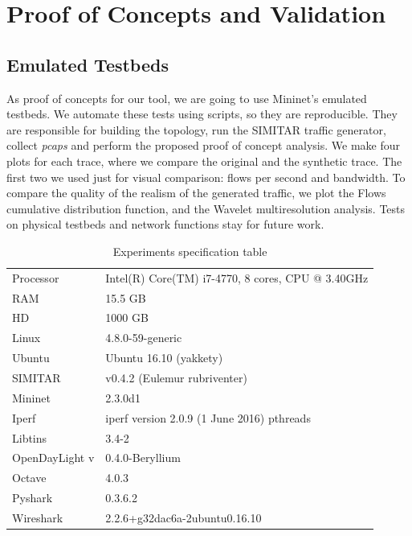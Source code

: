\chapter{Proof of Concepts and Validation}\label{ch:validation}

\section{Emulated Testbeds}



As proof of concepts for our tool, we are going to use Mininet's emulated testbeds. We automate these tests using scripts, so they are reproducible.  They are responsible for building the topology, run the SIMITAR traffic generator, collect \textit{pcaps} and perform the proposed proof of concept analysis.  We make four plots for each trace, where we compare the original and the synthetic trace. The first two we used just for visual comparison:  flows per second and bandwidth. To compare the quality of the realism of the generated traffic, we plot the Flows cumulative distribution function\cite{harpoon-paper}, and the Wavelet multiresolution analysis\cite{swing-paper}.  Tests on physical testbeds and network functions stay for future work.

\begin{table}[ht!]
	\centering
	\caption{Experiments specification table}
	\label{tab:specifications}
	\begin{tabular}{ll}
		\hline
		Processor            & Intel(R) Core(TM) i7-4770, 8 cores, CPU @ 3.40GHz \\
		RAM                  & 15.5 GB                                           \\
		HD                   & 1000 GB                                            \\
		Linux         & 4.8.0-59-generic                                  \\
		Ubuntu        & Ubuntu 16.10 (yakkety)                            \\
		SIMITAR       & v0.4.2 (Eulemur rubriventer)                      \\
		Mininet       & 2.3.0d1                                           \\
		Iperf         & iperf version 2.0.9 (1 June 2016) pthreads        \\
		Libtins       & 3.4-2                                             \\
		OpenDayLight v & 0.4.0-Beryllium                                   \\
		Octave        & 4.0.3                                             \\
		Pyshark              & 0.3.6.2                                           \\
		Wireshark            & 2.2.6+g32dac6a-2ubuntu0.16.10                     \\ \hline
	\end{tabular}
\end{table}


